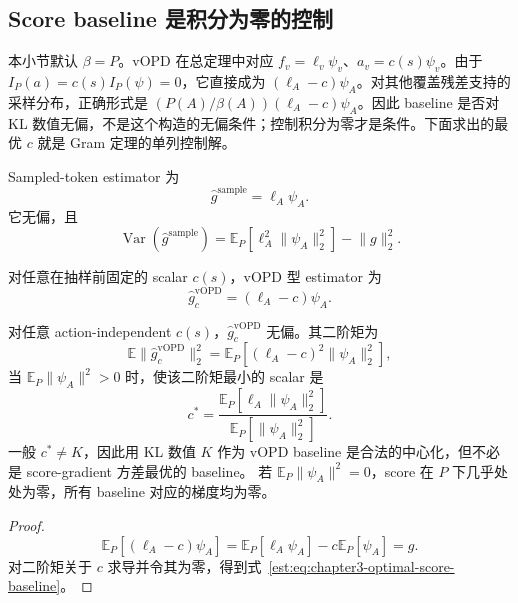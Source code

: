 \documentclass[lang=cn,scheme=chinese,openany]{../book/elegantbook}
\newcommand{\E}{\mathbb E}
\newcommand{\Var}{\operatorname{Var}}
\begin{document}
\subsection{Score baseline 是积分为零的控制}

本小节默认 $\beta=P$。vOPD 在总定理中对应 $f_v=\ell_v\psi_v$、$a_v=c(s)\psi_v$。由于 $I_P(a)=c(s)I_P(\psi)=0$，它直接成为 $(\ell_A-c)\psi_A$。对其他覆盖残差支持的采样分布，正确形式是 $(P(A)/\beta(A))(\ell_A-c)\psi_A$。因此 baseline 是否对 KL 数值无偏，不是这个构造的无偏条件；控制积分为零才是条件。下面求出的最优 $c$ 就是 Gram 定理的单列控制解。


Sampled-token estimator 为
\begin{equation*}
 \widehat g^{\mathrm{sample}}=\ell_A\psi_A.
\end{equation*}
它无偏，且
\begin{equation}
 \Var(\widehat g^{\mathrm{sample}})
 =\E_P[\ell_A^2\lVert \psi_A\rVert_2^2]-\lVert g\rVert_2^2.
 \label{est:eq:chapter3-sample-grad-var}
\end{equation}

对任意在抽样前固定的 scalar $c(s)$，vOPD 型 estimator 为
\begin{equation}
 \widehat g^{\mathrm{vOPD}}_c=(\ell_A-c)\psi_A.
 \label{est:eq:chapter3-vopd}
\end{equation}

\begin{proposition}
\label{est:prop:chapter3-vopd}
对任意 action-independent $c(s)$，$\widehat g^{\mathrm{vOPD}}_c$ 无偏。其二阶矩为
\begin{equation*}
 \E\lVert\widehat g^{\mathrm{vOPD}}_c\rVert_2^2
 =\E_P[(\ell_A-c)^2\lVert \psi_A\rVert_2^2],
\end{equation*}
当 $\E_P\lVert \psi_A\rVert^2>0$ 时，使该二阶矩最小的 scalar 是
\begin{equation}
 c^*=\frac{\E_P[\ell_A\lVert \psi_A\rVert_2^2]}{\E_P[\lVert \psi_A\rVert_2^2]}.
 \label{est:eq:chapter3-optimal-score-baseline}
\end{equation}
一般 $c^*\neq K$，因此用 KL 数值 $K$ 作为 vOPD baseline 是合法的中心化，但不必是 score-gradient 方差最优的 baseline。
若 $\E_P\lVert \psi_A\rVert^2=0$，score 在 $P$ 下几乎处处为零，所有 baseline 对应的梯度均为零。
\end{proposition}

\begin{proof}
\begin{equation*}
 \E_P[(\ell_A-c)\psi_A]=\E_P[\ell_A\psi_A]-c\E_P[\psi_A]=g.
\end{equation*}
对二阶矩关于 $c$ 求导并令其为零，得到式~\eqref{est:eq:chapter3-optimal-score-baseline}。
\end{proof}
\end{document}
